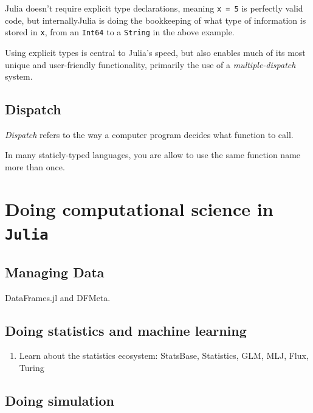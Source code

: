 \documentclass[10pt,oneside]{article}
\begin{document}
Julia doesn't require explicit type declarations, meaning
\texttt{x\ =\ 5} is perfectly valid code, but internallyJulia is doing
the bookkeeping of what type of information is stored in \texttt{x},
from an \texttt{Int64} to a \texttt{String} in the above example.

Using explicit types is central to Julia's speed, but also enables much
of its most unique and user-friendly functionality, primarily the use of
a \emph{multiple-dispatch} system.

\hypertarget{dispatch}{%
\subsection{Dispatch}\label{dispatch}}

\emph{Dispatch} refers to the way a computer program decides what
function to call.

In many staticly-typed languages, you are allow to use the same function
name more than once.

\hypertarget{doing-computational-science-in-julia}{%
\section{\texorpdfstring{Doing computational science in
\texttt{Julia}}{Doing computational science in Julia}}\label{doing-computational-science-in-julia}}

\hypertarget{managing-data}{%
\subsection{Managing Data}\label{managing-data}}

DataFrames.jl and DFMeta.

\hypertarget{doing-statistics-and-machine-learning}{%
\subsection{Doing statistics and machine
learning}\label{doing-statistics-and-machine-learning}}

\begin{enumerate}
\def\labelenumi{\arabic{enumi}.}
\setcounter{enumi}{6}
\tightlist
\item
  Learn about the statistics ecosystem: StatsBase, Statistics, GLM, MLJ,
  Flux, Turing
\end{enumerate}

\hypertarget{doing-simulation}{%
\subsection{Doing simulation}\label{doing-simulation}}
\end{document}
